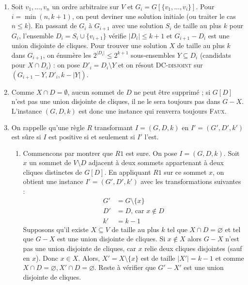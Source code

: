 \begin{td-sol}
    \begin{enumerate}
        \item Soit \(v_1, \ldots, v_n\) un ordre arbitraire sur \(V\) et \(G_i = G[\{v_1, \ldots, v_i\}]\).
        Pour \(i = \min(n, k+1)\), on peut deviner une solution initiale (ou traiter le cas \(n \le k\)).
        En passant de \(G_i\) \`a \(G_{i+1}\) avec une solution \(S_i\) de taille au plus \(k\) pour \(G_i\), l'ensemble \(D_i = S_i \cup \{v_{i+1}\}\) v\'erifie \(|D_i| \le k + 1\) et \(G_{i+1} - D_i\) est une union disjointe de cliques.
        Pour trouver une solution \(X\) de taille au plus \(k\) dans \(G_{i+1}\), on \'enum\`ere les \(2^{|D_i|} \le 2^{k+1}\) sous-ensembles \(Y \subseteq D_i\) (candidats pour \(X \cap D_i\)) : on pose \(D'_i = D_i \setminus Y\) et on r\'esout \textsc{DC-disjoint} sur \((G_{i+1} - Y, D'_i, k - |Y|)\).
        \item Comme \(X \cap D = \emptyset\), aucun sommet de \(D\) ne peut \^etre supprim\'e ; si \(G[D]\) n'est pas une union disjointe de cliques, il ne le sera toujours pas dans \(G - X\). L'instance \((G, D, k)\) est donc une instance qui renverra toujours \textsc{Faux}.
        \item On rappelle qu'une r\`egle \(R\) transformant \(I = (G, D, k)\) en \(I' = (G', D', k')\) est s\^ure si \(I\) est positive si et seulement si \(I'\) l'est. 
        
        \begin{enumerate}
            \item Commencons par montrer que \(R1\) est sure.
            On pose \(I = (G, D, k)\). Soit \(x\) un sommet de \(V \setminus D\) adjacent à deux sommets appartenant à deux cliques distinctes de \(G[D]\). En appliquant \(R1\) sur ce sommet \(x\), on obtient une instance \(I' = (G', D', k')\) avec les transformations suivantes :
            \begin{equation*}
                \begin{aligned}
                    G' &= G \setminus \{x\} \\
                    D' &= D \text{, car } x\notin D \\
                    k' &= k - 1
                \end{aligned}
            \end{equation*}
            Supposons qu'il existe \(X \subseteq V\) de taille au plus \(k\) tel que \(X \cap D = \varnothing\) et tel que \(G - X\) est une union disjointe de cliques.
            Si \(x \notin X\) alors \(G - X\) n'est pas une union disjointe de cliques, car \(x\) relie deux cliques disjointes (sauf en \(x\)). Donc \(x\in X\). Alors, \(X' = X \setminus \{x\}\) est de taille \(|X'| = k-1\) et comme \(X \cap D = \varnothing, X' \cap D = \varnothing\). Reste à vérifier que \(G' - X'\) est une union disjointe de cliques.


\end{enumerate}
\end{enumerate}
\end{td-sol}
